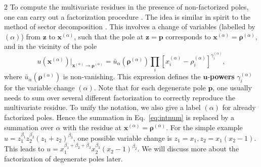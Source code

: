 \documentclass[fleqn]{2023SCGE}
\begin{document}
\begin{multicols}{2}
To compute the multivariate residues in the presence of non-factorized poles, one can carry out a factorization procedure \cite{Chestnov:2022xsy}. The idea is similar in spirit to the method of sector decomposition \cite{Binoth:2000ps, Binoth:2003ak, Binoth:2004jv, Heinrich:2008si, Bogner:2007cr, Smirnov:2021rhf, Borowka:2017idc}. This involves a change of variables (labelled by $(\alpha)$) from $\bm{z}$ to $\bm{x}^{(\alpha)}$, such that the pole at $\bm{z}=\bm{p}$ corresponds to $\bm{x}^{(\alpha)}=\bm{\rho}^{(\alpha)}$, and in the vicinity of the pole
\begin{equation}
    u(\bm{x}^{(\alpha)})\big|_{\bm{x}^{(\alpha)} \to \bm{\rho}^{(\alpha)}} = \bar{u}_\alpha(\bm{\rho}^{(\alpha)}) \prod_i \left[ x_i^{(\alpha)} - \rho_i^{(\alpha)} \right]^{\gamma_i^{(\alpha)}} ,
    \label{eq:degenerate}
\end{equation}
where $\bar{u}_\alpha(\bm{\rho}^{(\alpha)})$ is non-vanishing. This expression defines the $\bm{u}$-\textbf{powers} $\gamma^{(\alpha)}_i$ for the variable change $(\alpha)$. Note that for each degenerate pole $\bm{p}$, one usually needs to sum over several different factorization to correctly reproduce the multivariate residue. To unify the notation, we also give a label $(\alpha)$ for already factorized poles. Hence the summation in Eq.~\eqref{eq:intnum} is replaced by a summation over $\alpha$ with the residue at $\bm{x}^{(\alpha)}=\bm{\rho}^{(\alpha)}$.
For the simple example $u=z_1^{\beta_1} z_2^{\beta_2} (z_1+z_2)^{\beta_3}$, one possible variable change is $z_1=x_1, z_2 = x_1(x_2-1)$. This leads to $u=x_1^{\beta_1+\beta_2+\beta_3} x_2^{\beta_3} (x_2-1)^{\beta_2}$. We will discuss more about the factorization of degenerate poles later.




\end{multicols}
\end{document}
